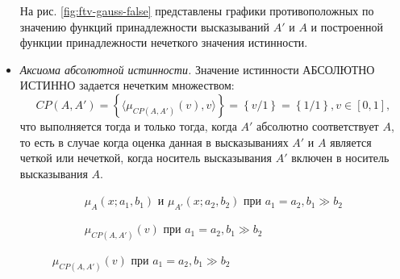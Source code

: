 \begin{itemize}
На рис. \cref{fig:ftv-gauss-false} представлены графики противоположных по значению функций принадлежности высказываний $A'$ и $A$ и построенной функции принадлежности нечеткого значения истинности.
\item \textit{Аксиома абсолютной истинности.}  Значение истинности АБСОЛЮТНО ИСТИННО задается нечетким множеством:
\begin{equation*}
CP(A, A') = \left\{\langle\mu_{CP(A, A')}(v), v\rangle\right\} = \left\{v/1\right\} = \left\{1/1\right\}, v \in [0, 1],
\end{equation*}
что выполняется тогда и только тогда, когда $A'$ абсолютно соответствует $A$, то есть в случае когда оценка данная в высказываниях $A'$ и $A$ является четкой или нечеткой, когда носитель высказывания $A'$ включен в носитель высказывания $A$.

\begin{figure}[ht]
	\newcommand{\aOne}{0.5}
	\newcommand{\bOne}{0.05}
	\newcommand{\aTwo}{0.5}
	\newcommand{\bTwo}{0.05}
	\begin{subfigure}[t]{0.5\textwidth}
		\caption{$\mu_A(x; a_1, b_1)$ и $\mu_{A'}(x; a_2, b_2)$ при $a_1 = a_2, b_1 \gg b_2$}
	\end{subfigure}
	\begin{subfigure}[t]{0.5\textwidth}
		\caption{$\mu_{CP(A,A')}(v)$ при $a_1 = a_2, b_1 \gg b_2$}
	\end{subfigure}
	\label{fig:ftv-gauss-absolute-true}
\end{figure}


\end{itemize}
